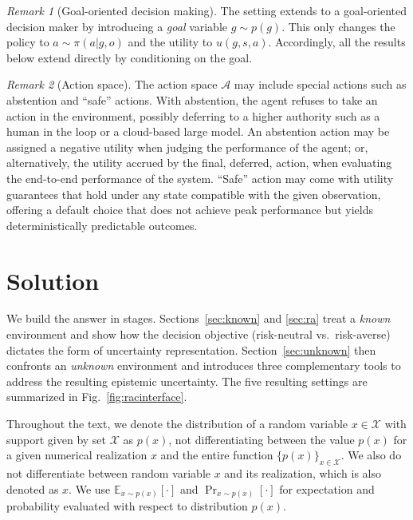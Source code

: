 \documentclass[journal]{IEEEtran}
\theoremstyle{definition}
\theoremstyle{remark}
\newtheorem{remark}{Remark}
\newcommand{\E}{\mathbb{E}}
\begin{document}
\begin{remark}[Goal-oriented decision making]
The setting extends to a goal-oriented decision maker by introducing a
\emph{goal} variable $g\sim p(g)$. This only changes the policy to
$a \sim \pi(a| g,o)$ and the utility to $u( g,s,a)$. Accordingly, all the
results below extend directly by conditioning on the goal.
\end{remark}

{ 
\begin{remark}[Action space] The action space $\mathcal{A}$ may include special actions such as abstention and ``safe'' actions. With abstention,  the agent refuses to take an action in the environment, possibly deferring to a higher authority such as a human in the loop or a cloud-based large model. An abstention  action may be assigned a negative utility when judging the performance of the agent; or, alternatively, the utility accrued by the final, deferred, action, when evaluating the end-to-end performance of the system. ``Safe'' action may come with utility guarantees that hold under any state compatible with the given observation, offering a default choice that does not achieve peak performance but yields deterministically predictable outcomes.

\end{remark}}
\section{Solution}
We build the answer in stages. Sections~\ref{sec:known} and \ref{sec:ra}
treat a \emph{known} environment and show how the decision objective
(risk-neutral vs.\ risk-averse) dictates the form of uncertainty
representation. Section~\ref{sec:unknown} then confronts an \emph{unknown}
environment and introduces three complementary tools to address the resulting
epistemic uncertainty. The five resulting settings are summarized in
Fig.~\ref{fig:racinterface}.

Throughout the text, we denote the distribution of a  random variable $x\in \mathcal{X}$ with support given by set $\mathcal{X}$ as $p(x)$, not differentiating between the value $p(x)$ for a given numerical realization $x$ and the entire function $\{p(x)\}_{x\in \mathcal{X}}$.  We also do not differentiate between random variable $x$ and its realization, which is also denoted as $x$. We use $\E_{x\sim p(x)}[\cdot]$ and $\Pr_{x\sim p(x)}[\cdot]$ for expectation and probability evaluated with respect to distribution $p(x)$.
\end{document}
